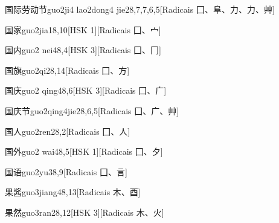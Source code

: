 \begin{entry}{国际劳动节}{guo2ji4 lao2dong4 jie2}{8,7,7,6,5}[Radicais ⼞、⾩、⼒、⼒、⾋]
\end{entry}

\begin{entry}{国家}{guo2jia1}{8,10}[HSK 1][Radicais ⼞、⼧]
\end{entry}

\begin{entry}{国内}{guo2 nei4}{8,4}[HSK 3][Radicais ⼞、⼌]
\end{entry}

\begin{entry}{国旗}{guo2qi2}{8,14}[Radicais ⼞、⽅]
\end{entry}

\begin{entry}{国庆}{guo2 qing4}{8,6}[HSK 3][Radicais ⼞、⼴]
\end{entry}

\begin{entry}{国庆节}{guo2qing4jie2}{8,6,5}[Radicais ⼞、⼴、⾋]
\end{entry}

\begin{entry}{国人}{guo2ren2}{8,2}[Radicais ⼞、⼈]
\end{entry}

\begin{entry}{国外}{guo2 wai4}{8,5}[HSK 1][Radicais ⼞、⼣]
\end{entry}

\begin{entry}{国语}{guo2yu3}{8,9}[Radicais ⼞、⾔]
\end{entry}

\begin{entry}{果酱}{guo3jiang4}{8,13}[Radicais ⽊、⾣]
\end{entry}

\begin{entry}{果然}{guo3ran2}{8,12}[HSK 3][Radicais ⽊、⽕]
\end{entry}

